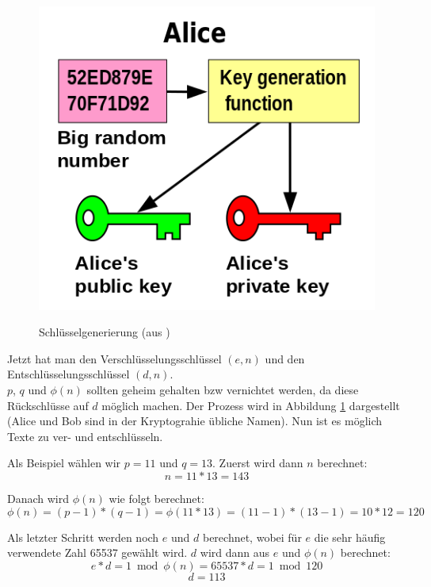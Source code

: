 \documentclass[12pt,a4paper]{scrartcl}
\begin{document}
\begin{figure}[h]
\centering
\includegraphics[scale=0.5]{Orange_blue_public_private_keygeneration} \\
\caption{Schlüsselgenerierung (aus \cite{wikipedia_keygen})}
\label{fig:figure1}
\end{figure}

Jetzt hat man den Verschlüsselungsschlüssel $(e, n)$ und den Entschlüsselungsschlüssel $(d, n)$. \\
$p$, $q$ und $\phi(n)$ sollten geheim gehalten bzw vernichtet werden, da diese Rückschlüsse auf $d$ möglich machen. Der Prozess wird in Abbildung \ref{fig:figure1} dargestellt (Alice und Bob sind in der Kryptograhie übliche Namen). Nun ist es möglich Texte zu ver- und entschlüsseln. 

Als Beispiel wählen wir $p=11$ und $q=13$.
Zuerst wird dann $n$ berechnet:
$$n = 11*13 = 143$$

Danach wird $\phi (n)$ wie folgt berechnet:
$$\phi(n) = (p-1)*(q-1) = \phi(11*13) = (11 - 1) * (13-1) = 10 * 12 = 120$$

Als letzter Schritt werden noch $e$ und $d$ berechnet, wobei für $e$ die sehr häufig verwendete Zahl 65537 gewählt wird. \cite[S.3]{eNumber}  $d$ wird dann aus $e$ und $\phi(n)$ berechnet:
$$e * d = 1 \bmod \phi(n) = 65537 * d = 1 \bmod 120$$
$$ d = 113$$
\end{document}
